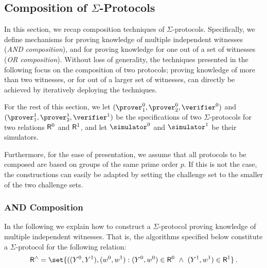 \documentclass[runningheads,11pt]{article}
\begin{document}
\subsection{Composition of $\Sigma$-Protocols}
\label{sec:composition}
\label{sec:or-comp}
\label{sec:and-comp}
  In this section, we recap composition techniques of $\Sigma$-protocols.
  Specifically, we define mechanisms for proving knowledge of multiple independent witnesses (\emph{AND composition}), and for proving knowledge for one out of a set of witnesses (\emph{OR composition}).
  Without loss of generality, the techniques presented in the following focus on the composition of two protocols;
  proving knowledge of more than two witnesses, or for out of a larger set of witnesses, can directly be achieved by iteratively deploying the techniques.

  For the rest of this section, we let $(\prover_1^0,\prover_2^0,\verifier^0)$ and $(\prover_1^1,\prover_2^1,\verifier^1)$ be the specifications of two $\Sigma$-protocols for two relations $\mathsf{R}^0$ and $\mathsf{R}^1$, and let $\simulator^0$ and $\simulator^1$ be their simulators.

  Furthermore, for the ease of presentation, we assume that all protocols to be composed are based on groups of the same prime order $p$.
  If this is not the case, the constructions can easily be adapted by setting the challenge set to the smaller of the two challenge sets.

\subsubsection{AND Composition}
  In the following we explain how to construct a $\Sigma$-protocol proving knowledge of multiple independent witnesses.
  That is, the algorithms specified below constitute a $\Sigma$-protocol for the following relation:
\[
  \relation^\land = \set{
    ((\statement^0,\statement^1),(\witness^0,\witness^1) : (\statement^0,\witness^0)\in \relation^0 ~\land~ (\statement^1,\witness^1)\in\relation^1}\,.
\]
\end{document}
